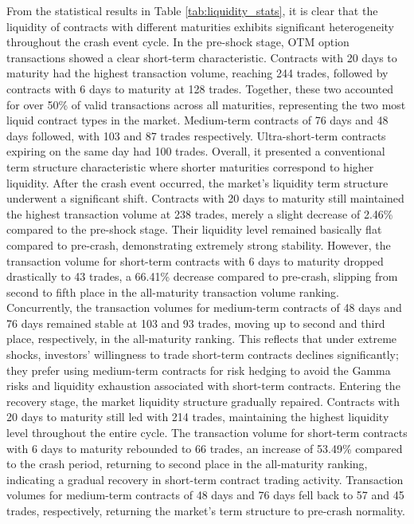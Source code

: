 From the statistical results in Table \ref{tab:liquidity_stats}, it is clear that the liquidity of contracts with different maturities exhibits significant heterogeneity throughout the crash event cycle. In the pre-shock stage, OTM option transactions showed a clear short-term characteristic. Contracts with 20 days to maturity had the highest transaction volume, reaching 244 trades, followed by contracts with 6 days to maturity at 128 trades. Together, these two accounted for over 50\% of valid transactions across all maturities, representing the two most liquid contract types in the market. Medium-term contracts of 76 days and 48 days followed, with 103 and 87 trades respectively. Ultra-short-term contracts expiring on the same day had 100 trades. Overall, it presented a conventional term structure characteristic where shorter maturities correspond to higher liquidity. After the crash event occurred, the market's liquidity term structure underwent a significant shift. Contracts with 20 days to maturity still maintained the highest transaction volume at 238 trades, merely a slight decrease of 2.46\% compared to the pre-shock stage. Their liquidity level remained basically flat compared to pre-crash, demonstrating extremely strong stability. However, the transaction volume for short-term contracts with 6 days to maturity dropped drastically to 43 trades, a 66.41\% decrease compared to pre-crash, slipping from second to fifth place in the all-maturity transaction volume ranking. Concurrently, the transaction volumes for medium-term contracts of 48 days and 76 days remained stable at 103 and 93 trades, moving up to second and third place, respectively, in the all-maturity ranking. This reflects that under extreme shocks, investors' willingness to trade short-term contracts declines significantly; they prefer using medium-term contracts for risk hedging to avoid the Gamma risks and liquidity exhaustion associated with short-term contracts. Entering the recovery stage, the market liquidity structure gradually repaired. Contracts with 20 days to maturity still led with 214 trades, maintaining the highest liquidity level throughout the entire cycle. The transaction volume for short-term contracts with 6 days to maturity rebounded to 66 trades, an increase of 53.49\% compared to the crash period, returning to second place in the all-maturity ranking, indicating a gradual recovery in short-term contract trading activity. Transaction volumes for medium-term contracts of 48 days and 76 days fell back to 57 and 45 trades, respectively, returning the market's term structure to pre-crash normality.

